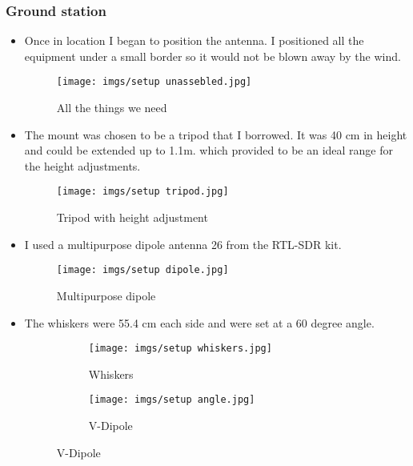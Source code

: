 \documentclass{article}
\begin{document}
        \subsubsection{Ground station}
            \begin{itemize}
                \item[] Once in location I began to position the antenna. I positioned all the equipment under a small border so it would not be blown away by the wind. 

                \begin{figure}[H]
                    \centering
                    \texttt{[image: imgs/setup unassebled.jpg]}
                    \caption{All the things we need}
                    \label{img:unassembled}
                \end{figure}

                \item[] The mount was chosen to be  a tripod that I borrowed. It was 40 cm in height and could be extended up to 1.1m. which provided to be an ideal range for the height adjustments.

                \begin{figure}[H]
                    \centering
                    \texttt{[image: imgs/setup tripod.jpg]}
                    \caption{Tripod with height adjustment}
                    \label{img:tripod}
                \end{figure}

                \item[] I used a multipurpose dipole antenna 26 from the RTL-SDR kit.

                \begin{figure}[H]
                    \centering
                    \texttt{[image: imgs/setup dipole.jpg]}
                    \caption{Multipurpose dipole}
                    \label{img:dipole}
                \end{figure}

                \item[] The whiskers were 55.4 cm each side and were set at a 60 degree angle.

                \begin{figure}[H]
                    \centering
                    \begin{subfigure}{\textwidth}
                        \centering
                        \texttt{[image: imgs/setup whiskers.jpg]}
                        \caption{Whiskers}
                        \label{img:whiskers}
                    \end{subfigure}%
                    \begin{subfigure}{\textwidth}
                        \centering
                        \texttt{[image: imgs/setup angle.jpg]}
                        \caption{V-Dipole}
                        \label{img:vdipole}
                    \end{subfigure}
                    \label{fig:test}
                \end{figure}


\end{itemize}
\end{document}
